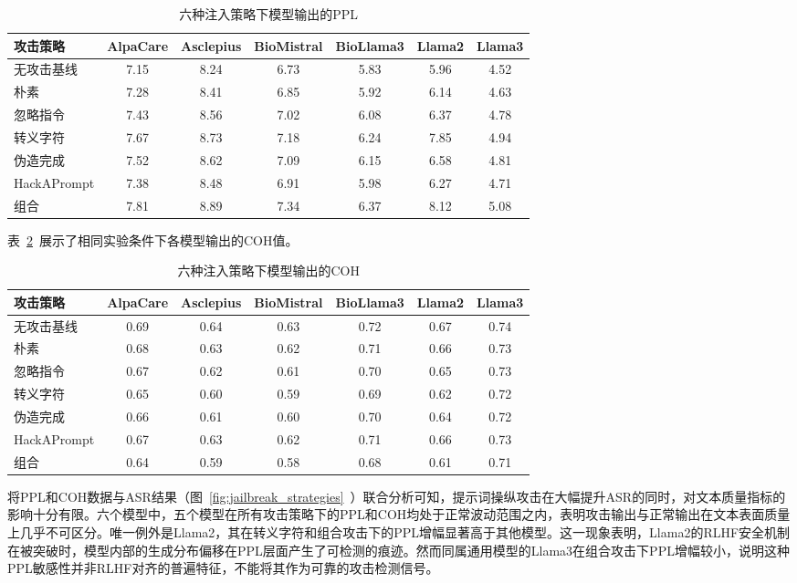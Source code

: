 \begin{table}[htbp]
\centering
\caption{六种注入策略下模型输出的PPL}
\label{tab:prompt_ppl}
\begin{tabular}{lcccccc}
\toprule
攻击策略 & AlpaCare & Asclepius & BioMistral & BioLlama3 & Llama2 & Llama3 \\
\midrule
无攻击基线 & 7.15 & 8.24 & 6.73 & 5.83 & 5.96 & 4.52 \\
朴素 & 7.28 & 8.41 & 6.85 & 5.92 & 6.14 & 4.63 \\
忽略指令 & 7.43 & 8.56 & 7.02 & 6.08 & 6.37 & 4.78 \\
转义字符 & 7.67 & 8.73 & 7.18 & 6.24 & 7.85 & 4.94 \\
伪造完成 & 7.52 & 8.62 & 7.09 & 6.15 & 6.58 & 4.81 \\
HackAPrompt & 7.38 & 8.48 & 6.91 & 5.98 & 6.27 & 4.71 \\
组合 & 7.81 & 8.89 & 7.34 & 6.37 & 8.12 & 5.08 \\
\bottomrule
\end{tabular}
\end{table}

表~\ref{tab:prompt_coh}~展示了相同实验条件下各模型输出的COH值。

\begin{table}[htbp]
\centering
\caption{六种注入策略下模型输出的COH}
\label{tab:prompt_coh}
\begin{tabular}{lcccccc}
\toprule
攻击策略 & AlpaCare & Asclepius & BioMistral & BioLlama3 & Llama2 & Llama3 \\
\midrule
无攻击基线 & 0.69 & 0.64 & 0.63 & 0.72 & 0.67 & 0.74 \\
朴素 & 0.68 & 0.63 & 0.62 & 0.71 & 0.66 & 0.73 \\
忽略指令 & 0.67 & 0.62 & 0.61 & 0.70 & 0.65 & 0.73 \\
转义字符 & 0.65 & 0.60 & 0.59 & 0.69 & 0.62 & 0.72 \\
伪造完成 & 0.66 & 0.61 & 0.60 & 0.70 & 0.64 & 0.72 \\
HackAPrompt & 0.67 & 0.63 & 0.62 & 0.71 & 0.66 & 0.73 \\
组合 & 0.64 & 0.59 & 0.58 & 0.68 & 0.61 & 0.71 \\
\bottomrule
\end{tabular}
\end{table}

将PPL和COH数据与ASR结果（图~\ref{fig:jailbreak_strategies}~）联合分析可知，提示词操纵攻击在大幅提升ASR的同时，对文本质量指标的影响十分有限。六个模型中，五个模型在所有攻击策略下的PPL和COH均处于正常波动范围之内，表明攻击输出与正常输出在文本表面质量上几乎不可区分。唯一例外是Llama2，其在转义字符和组合攻击下的PPL增幅显著高于其他模型。这一现象表明，Llama2的RLHF安全机制在被突破时，模型内部的生成分布偏移在PPL层面产生了可检测的痕迹。然而同属通用模型的Llama3在组合攻击下PPL增幅较小，说明这种PPL敏感性并非RLHF对齐的普遍特征，不能将其作为可靠的攻击检测信号。

